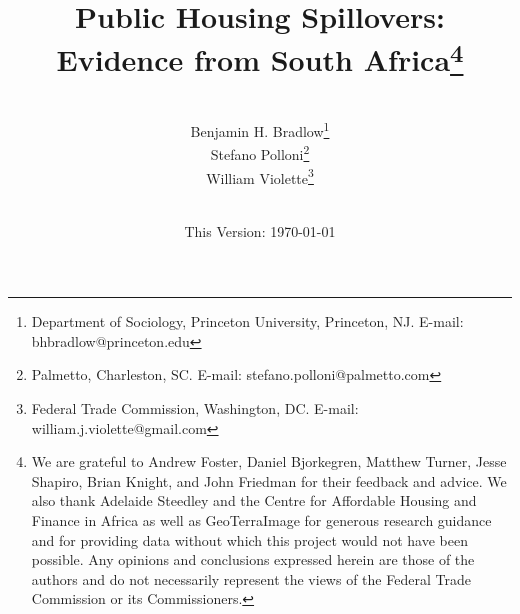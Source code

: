 \documentclass[12pt]{article}
\begin{document}
\begin{titlepage} 
\title{{Public Housing Spillovers:  Evidence from South Africa}\thanks{We are grateful to Andrew Foster, Daniel Bjorkegren, Matthew Turner, Jesse Shapiro, Brian Knight, and John Friedman for their feedback and advice.  We also thank Adelaide Steedley and the Centre for Affordable Housing and Finance in Africa as well as GeoTerraImage for generous research guidance and for providing data without which this project would not have been possible.  Any opinions and conclusions expressed herein are those of the authors and do not necessarily represent the views of the Federal Trade Commission or its Commissioners.}}
\author{\\[3em] Benjamin H. Bradlow\thanks{Department of Sociology, Princeton University, Princeton, NJ. E-mail: bhbradlow@princeton.edu}\\
 Stefano Polloni\thanks{Palmetto, Charleston, SC.   E-mail: stefano.polloni@palmetto.com}\\ 
  William Violette\thanks{Federal Trade Commission, Washington, DC. E-mail: william.j.violette@gmail.com} \\
 \\ 
  }
\date{\vspace{5mm}This Version: \today}
\maketitle
\begin{abstract}









\end{abstract}
\end{titlepage}
\end{document}
